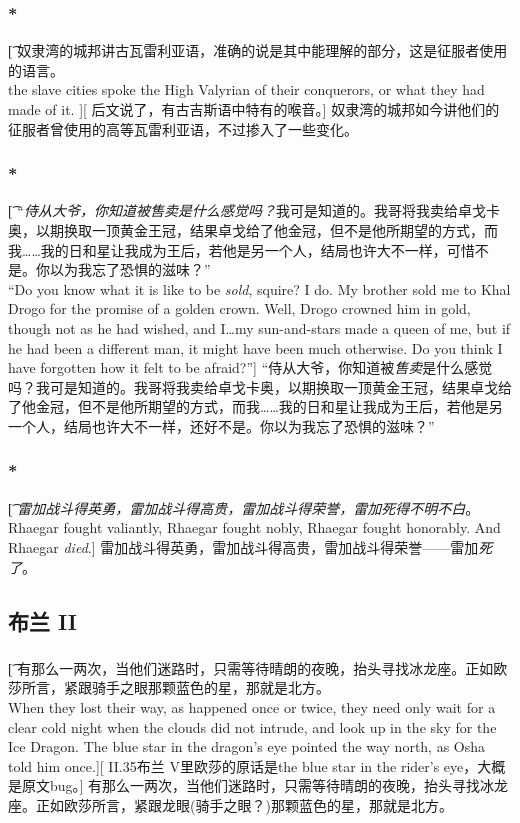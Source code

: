 \documentclass[12pt,a4paper]{article}
\begin{document}
\subsubsection{\color{red}*}\t[
	 奴隶湾的城邦讲古瓦雷利亚语，准确的说是其中能理解的部分，这是征服者使用的语言。\\
	 the slave cities spoke the High Valyrian of their conquerors, or what they had made of it. ][
	 后文说了，有古吉斯语中特有的喉音。]
	 奴隶湾的城邦如今讲他们的征服者曾使用的高等瓦雷利亚语，不过掺入了一些变化。
	 	
\subsubsection{\color{red}*}\t[
	“\emph{侍从大爷，你知道被售卖是什么感觉吗？}我可是知道的。我哥将我卖给卓戈卡奥，以期换取一顶黄金王冠，结果卓戈给了他金冠，但不是他所期望的方式，而我……我的日和星让我成为王后，若他是另一个人，结局也许大不一样，可惜不是。你以为我忘了恐惧的滋味？”\\
	“Do you know what it is like to be \emph{sold}, squire? I do. My brother sold me to Khal Drogo for the promise of a golden crown. Well, Drogo crowned him in gold, though not as he had wished, and I\ldots my sun-and-stars made a queen of me, but if he had been a different man, it might have been much otherwise. Do you think I have forgotten how it felt to be afraid?”]
	“侍从大爷，你知道被\emph{售卖}是什么感觉吗？我可是知道的。我哥将我卖给卓戈卡奥，以期换取一顶黄金王冠，结果卓戈给了他金冠，但不是他所期望的方式，而我……我的日和星让我成为王后，若他是另一个人，结局也许大不一样，还好不是。你以为我忘了恐惧的滋味？”
	
\subsubsection{\color{red}*}\t[	
	\emph{雷加战斗得英勇，雷加战斗得高贵，雷加战斗得荣誉，雷加死得不明不白}。\\
	Rhaegar fought valiantly, Rhaegar fought nobly, Rhaegar fought honorably. And Rhaegar \emph{died}.]
	雷加战斗得英勇，雷加战斗得高贵，雷加战斗得荣誉——雷加\emph{死了}。
	
\subsection{布兰 II}
\subsubsection{}\t[
	有那么一两次，当他们迷路时，只需等待晴朗的夜晚，抬头寻找冰龙座。正如欧莎所言，紧跟骑手之眼那颗蓝色的星，那就是北方。\\
	When they lost their way, as happened once or twice, they need only wait for a clear cold night when the clouds did not intrude, and look up in the sky for the Ice Dragon. The blue star in the dragon's eye pointed the way north, as Osha told him once.][
	II.35布兰 V里欧莎的原话是the blue star in the rider's eye，大概是原文bug。]
	有那么一两次，当他们迷路时，只需等待晴朗的夜晚，抬头寻找冰龙座。正如欧莎所言，紧跟龙眼(骑手之眼？)那颗蓝色的星，那就是北方。
	
\end{document}
